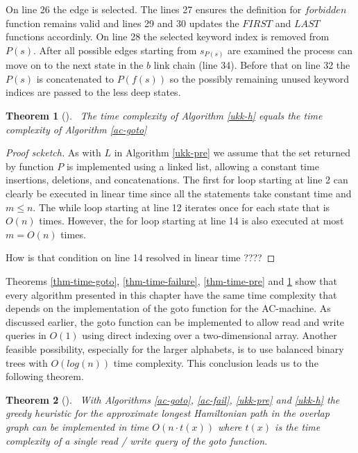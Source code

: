 \documentclass[english,twoside,censored,csm,algorithms-track-2020]{HYthesisML}
\theoremstyle{plain}
\newtheorem{theorem}{Theorem}[chapter]
\theoremstyle{definition}
\begin{document}
On line 26 the edge is selected. The lines 27 ensures the definition for $forbidden$ function
remains valid and lines 29 and 30 updates the $FIRST$ and $LAST$ functions accordinly. On line
28 the selected keyword index is removed from $P(s)$. After all possible edges starting from
$s_{P(s)}$ are examined the process can move on to the next state in the $b$ link chain (line 34).
Before that on line 32 the $P(s)$ is concatenated to $P(f(s))$ so the possibly remaining unused
keyword indices are passed to the less deep states.




\begin{theorem}[]~\label{thm-time-h}
  The time complexity of Algorithm \ref{ukk-h} equals the time complexity of
  Algorithm \ref{ac-goto}
\end{theorem}
\begin{proof}[Proof scketch]

As with $L$ in Algorithm \ref{ukk-pre}
we assume that the set returned by function $P$ is implemented using a linked list, allowing a constant
time insertions, deletions, and concatenations. The first for loop starting at line 2 can clearly be
executed in linear time since all the statements take constant time and $m \leq n $. The while loop
starting at line 12 iterates once for each state that is $O(n)$ times. However, the for loop starting
at line 14 is also executed at most $m = O(n)$ times.

How is that condition on line 14 resolved in linear time ????

\end{proof}

Theorems \ref{thm-time-goto}, \ref{thm-time-failure}, \ref{thm-time-pre} and \ref{thm-time-h}
show that every algorithm presented in this chapter have the same time complexity that depends
on the implementation of the goto function for the AC-machine. As discussed earlier, the goto function
can be implemented to allow read and write queries in  $O(1)$ using direct indexing over a
two-dimensional array. Another feasible possibility, especially for the larger alphabets,
is to use balanced
binary trees with $O(log(n))$ time complexity. This conclusion leads us to the following theorem.

\begin{theorem}[]~\label{thm-overall-time}
  With Algorithms \ref{ac-goto}, \ref{ac-fail}, \ref{ukk-pre} and \ref{ukk-h} the greedy heuristic
  for the approximate longest Hamiltonian path in the overlap graph can be implemented in time
  $O(n \cdot t(x))$ where $t(x)$ is the time complexity of a single read / write query of the
  goto function.
\end{theorem}
\end{document}
